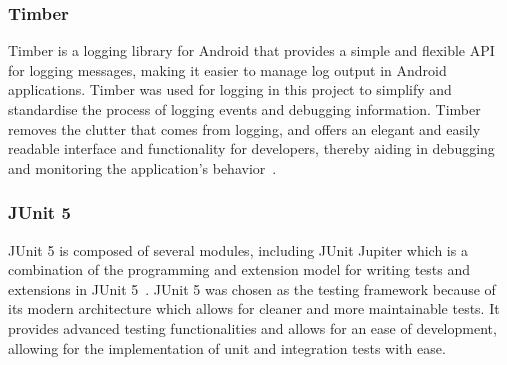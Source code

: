 \subsubsection{Timber}
\label{sec:timber}
Timber is a logging library for Android that provides a simple and flexible API for logging messages, making it easier to manage log output in Android applications. Timber was used for logging in this project to simplify and standardise the process of logging events and debugging information. Timber removes the clutter that comes from logging, and offers an elegant and easily readable interface and functionality for developers, thereby aiding in debugging and monitoring the application’s behavior~\cite{bib:timber}.

\subsubsection{JUnit 5}
\label{sec:junit}
JUnit 5 is composed of several modules, including JUnit Jupiter which is a combination of the programming and extension model for writing tests and extensions in JUnit 5~\cite{bib:junit}. JUnit 5 was chosen as the testing framework because of its modern architecture which allows for cleaner and more maintainable tests. It provides advanced testing functionalities and allows for an ease of development, allowing for the implementation of unit and integration tests with ease.


